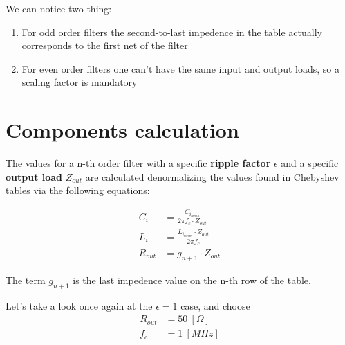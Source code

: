 \documentclass[a4paper,12pt]{report}
\begin{document}
We can notice two thing:
\begin{enumerate}
	\item For odd order filters the second-to-last impedence in the table actually corresponds to the first net of the filter
	\item For even order filters one can't have the same input and output loads, so a scaling factor is mandatory
\end{enumerate}

\section{Components calculation}

The values for a n-th order filter with a specific \textbf{ripple factor} $\epsilon$ and a specific \textbf{output load} $Z_{out}$ are calculated denormalizing the values found in Chebyshev tables via the following equations:

\begin{align}
	C_i &= \frac{C_{i_{norm}} }{2\pi f_c \cdot Z_{out}}\\
	L_i &= \frac{L_{i_{norm}} \cdot Z_{out} }{2\pi f_c}\\
	R_{out} &=g_{n+1} \cdot Z_{out}
\end{align}

The term $g_{n+1}$ is the last impedence value on the n-th row of the table.

Let's take a look once again at the  $\epsilon = 1$ case, and choose
\begin{align}
	R_{out} &= 50 \ [\Omega]\\
f_c &= 1 \ [MHz]
\end{align}
\end{document}
